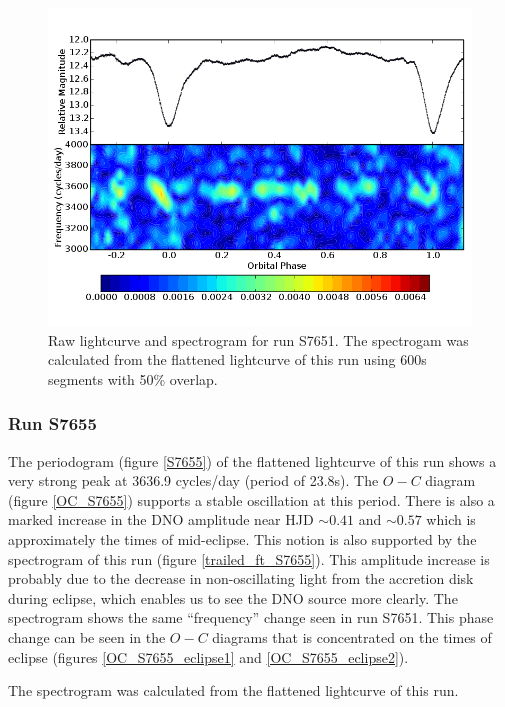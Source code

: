 \begin{figure}
 \centering
 \includegraphics[width = 0.8\columnwidth, bb=0 0 800 600]{images/trailed_FT_S7651_colour.png}
 \caption[Raw lightcurve and spectrogram for run S7651.]{Raw lightcurve and spectrogram for run S7651. The spectrogam was calculated from the flattened lightcurve of this run using 600s segments with 50\% overlap.}
 \label{trailed_ft_S7651}
\end{figure}

\subsubsection{Run S7655}

The periodogram (figure \ref{S7655}) of the flattened lightcurve of this run shows a very strong peak at 3636.9 cycles/day (period of 23.8s). The $O-C$ diagram (figure \ref{OC_S7655}) supports a stable oscillation at this period. There is also a marked increase in the DNO amplitude near HJD $\sim0.41$ and $\sim0.57$ which is approximately the times of mid-eclipse. This notion is also supported by the spectrogram of this run (figure \ref{trailed_ft_S7655}). This amplitude increase is probably due to the decrease in non-oscillating light from the accretion disk during eclipse, which enables us to see the DNO source more clearly. The spectrogram shows the same ``frequency'' change seen in run S7651. This phase change can be seen in the $O-C$ diagrams that is concentrated on the times of eclipse (figures \ref{OC_S7655_eclipse1} and \ref{OC_S7655_eclipse2}).



The spectrogram was calculated from the flattened lightcurve of this run.



